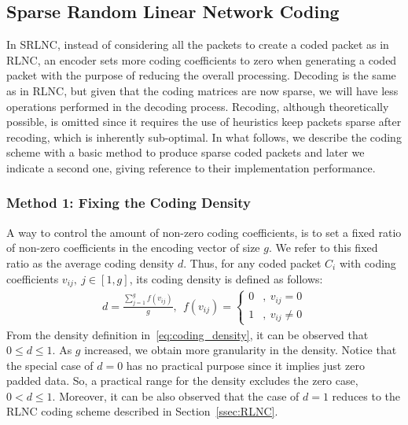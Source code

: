 \subsection{Sparse Random Linear Network Coding}

In \ac{SRLNC}, instead of considering all the packets to create a
coded packet as in \ac{RLNC}, an encoder sets more coding coefficients
to zero when generating a coded packet with the purpose of reducing
the overall processing.  Decoding is the same as in \ac{RLNC}, but
given that the coding matrices are now sparse, we will have less
operations performed in the decoding process.  Recoding, although
theoretically possible, is omitted since it requires the use of
heuristics keep packets sparse after recoding, which is inherently
sub-optimal. In what follows, we describe the coding scheme with a
basic method to produce sparse coded packets and later we indicate a
second one, giving reference to their implementation performance.

\subsubsection{Method 1: Fixing the Coding Density}
A way to control the amount of non-zero coding coefficients, is to set a
fixed ratio of non-zero coefficients in the encoding vector of size $g$. We
refer to this fixed ratio as the average coding density $d$. Thus, for any
coded packet $C_i$ with coding coefficients $v_{ij},\ j \in [1,g]$, its
coding density is defined as follows:
%
\begin{align}
\label{eq:coding_density}
d = \frac{\sum_{j=1}^{g} f(v_{ij})}{g},\ \
    f(v_{ij}) =
    \begin{cases}
        0 &,\ v_{ij} = 0 \\
        1 &,\ v_{ij} \neq 0
    \end{cases}
\end{align}
%
From the density definition in~\eqref{eq:coding_density}, it can be
observed that $0 \leq d \leq 1$. As $g$ increased, we obtain more
granularity in the density. Notice that the special case of  $d = 0$ has no
practical purpose since it implies just zero padded data. So, a practical
range for the density excludes the zero case, $0 < d \leq 1$. Moreover,
it can be also observed that the case of $d = 1$ reduces to the \ac{RLNC}
coding scheme described in Section~\ref{ssec:RLNC}.


